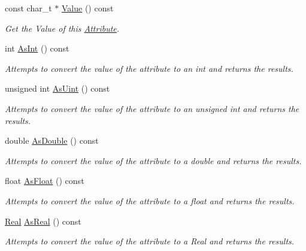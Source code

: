 \begin{DoxyCompactItemize}
const char\_\-t $\ast$ \hyperlink{classphys_1_1xml_1_1Attribute_a8a8099b39bca8894a8226ce0e82d3451}{Value} () const 
\begin{DoxyCompactList}\small\item\em Get the Value of this \hyperlink{classphys_1_1xml_1_1Attribute}{Attribute}. \item\end{DoxyCompactList}\item 
int \hyperlink{classphys_1_1xml_1_1Attribute_ada1f2e45ce636ad8482972263364e7fa}{AsInt} () const 
\begin{DoxyCompactList}\small\item\em Attempts to convert the value of the attribute to an int and returns the results. \item\end{DoxyCompactList}\item 
unsigned int \hyperlink{classphys_1_1xml_1_1Attribute_ad00ec5857fc4afcda892a0057419a9a0}{AsUint} () const 
\begin{DoxyCompactList}\small\item\em Attempts to convert the value of the attribute to an unsigned int and returns the results. \item\end{DoxyCompactList}\item 
double \hyperlink{classphys_1_1xml_1_1Attribute_a467ae167d5407ae3293a22b8873cb43a}{AsDouble} () const 
\begin{DoxyCompactList}\small\item\em Attempts to convert the value of the attribute to a double and returns the results. \item\end{DoxyCompactList}\item 
float \hyperlink{classphys_1_1xml_1_1Attribute_aad74f805b9318735011d698ee39113aa}{AsFloat} () const 
\begin{DoxyCompactList}\small\item\em Attempts to convert the value of the attribute to a float and returns the results. \item\end{DoxyCompactList}\item 
\hyperlink{namespacephys_af7eb897198d265b8e868f45240230d5f}{Real} \hyperlink{classphys_1_1xml_1_1Attribute_a1ed9ffa5461223647168309ae4c86809}{AsReal} () const 
\begin{DoxyCompactList}\small\item\em Attempts to convert the value of the attribute to a Real and returns the results. \item\end{DoxyCompactList}\item 

\end{DoxyCompactItemize}
